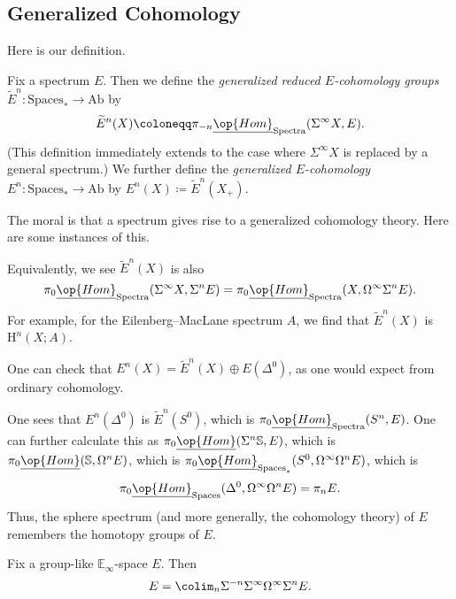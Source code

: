 \documentclass[../notes.tex]{subfiles}
\begin{document}
\subsection{Generalized Cohomology}
Here is our definition.
\begin{definition}
	Fix a spectrum $E$. Then we define the \textit{generalized reduced $E$-coho\-mo\-logy groups} $\widetilde E^n\colon\mathrm{Spaces}_*\to\mathrm{Ab}$ by
	\[\widetilde E^n(X)\coloneqq\pi_{-n}\underline{\op{Hom}}_{\mathrm{Spectra}}(\Sigma^\infty X,E).\]
	(This definition immediately extends to the case where $\Sigma^\infty X$ is replaced by a general spectrum.) We further define the \textit{generalized $E$-cohomology} $E^n\colon\mathrm{Spaces}_*\to\mathrm{Ab}$ by $E^n(X)\coloneqq\widetilde E^n(X_+)$.
\end{definition}
The moral is that a spectrum gives rise to a generalized cohomology theory. Here are some instances of this.
\begin{remark}
	Equivalently, we see $\widetilde E^n(X)$ is also
	\[\pi_0\underline{\op{Hom}}_{\mathrm{Spectra}}(\Sigma^\infty X,\Sigma^nE)=\pi_0\underline{\op{Hom}}_{\mathrm{Spectra}}(X,\Omega^\infty\Sigma^nE).\]
	For example, for the Eilenberg--MacLane spectrum $A$, we find that $\widetilde E^n(X)$ is $\mathrm H^n(X;A)$.
\end{remark}
\begin{remark}
	One can check that $E^n(X)=\widetilde E^n(X)\oplus E\left(\Delta^0\right)$, as one would expect from ordinary cohomology.
\end{remark}
\begin{remark} \label{rem:cohomology-on-point}
	One sees that $E^n\left(\Delta^0\right)$ is $\widetilde E^n\left(S^0\right)$, which is $\pi_0\underline{\op{Hom}}_{\mathrm{Spectra}}(S^n,E)$. One can further calculate this as $\pi_0\underline{\op{Hom}}(\Sigma^n\mathbb S,E)$, which is $\pi_0\underline{\op{Hom}}(\mathbb S,\Omega^nE)$, which is $\pi_0\underline{\op{Hom}}_{\mathrm{Spaces}_*}(S^0,\Omega^\infty\Omega^nE)$, which is
	\[\pi_0\underline{\op{Hom}}_{\mathrm{Spaces}}(\Delta^0,\Omega^\infty\Omega^nE)=\pi_nE.\]
	Thus, the sphere spectrum (and more generally, the cohomology theory) of $E$ remembers the homotopy groups of $E$.
\end{remark}
\begin{lemma} \label{lem:e-infinity-spectra-as-colim}
	Fix a group-like $\mathbb E_\infty$-space $E$. Then
	\[E=\colim_n\Sigma^{-n}\Sigma^\infty\Omega^\infty\Sigma^nE.\]
\end{lemma}
\end{document}
